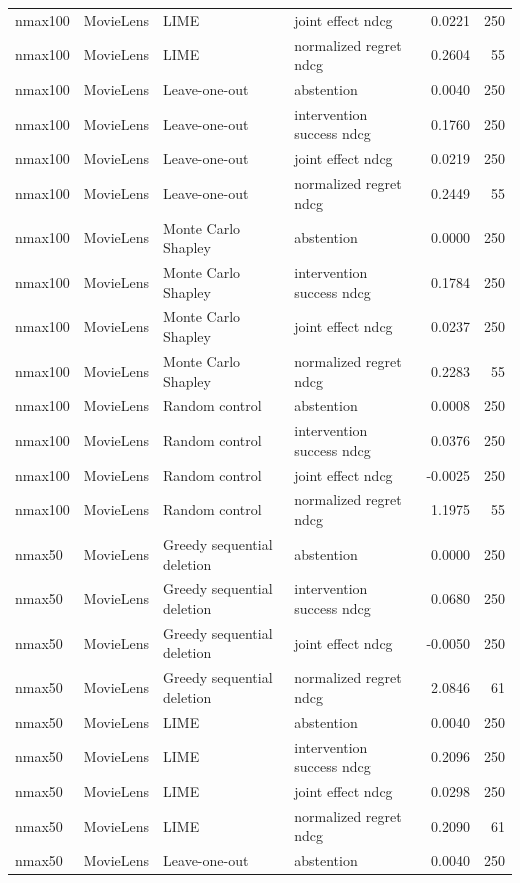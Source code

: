 \begin{longtable}{@{}p{}p{}p{}p{}rr@{}}
nmax100 & MovieLens & LIME & joint effect ndcg & 0.0221 & 250 \\
nmax100 & MovieLens & LIME & normalized regret ndcg & 0.2604 & 55 \\
nmax100 & MovieLens & Leave-one-out & abstention & 0.0040 & 250 \\
nmax100 & MovieLens & Leave-one-out & intervention success ndcg & 0.1760 & 250 \\
nmax100 & MovieLens & Leave-one-out & joint effect ndcg & 0.0219 & 250 \\
nmax100 & MovieLens & Leave-one-out & normalized regret ndcg & 0.2449 & 55 \\
nmax100 & MovieLens & Monte Carlo Shapley & abstention & 0.0000 & 250 \\
nmax100 & MovieLens & Monte Carlo Shapley & intervention success ndcg & 0.1784 & 250 \\
nmax100 & MovieLens & Monte Carlo Shapley & joint effect ndcg & 0.0237 & 250 \\
nmax100 & MovieLens & Monte Carlo Shapley & normalized regret ndcg & 0.2283 & 55 \\
nmax100 & MovieLens & Random control & abstention & 0.0008 & 250 \\
nmax100 & MovieLens & Random control & intervention success ndcg & 0.0376 & 250 \\
nmax100 & MovieLens & Random control & joint effect ndcg & -0.0025 & 250 \\
nmax100 & MovieLens & Random control & normalized regret ndcg & 1.1975 & 55 \\
nmax50 & MovieLens & Greedy sequential deletion & abstention & 0.0000 & 250 \\
nmax50 & MovieLens & Greedy sequential deletion & intervention success ndcg & 0.0680 & 250 \\
nmax50 & MovieLens & Greedy sequential deletion & joint effect ndcg & -0.0050 & 250 \\
nmax50 & MovieLens & Greedy sequential deletion & normalized regret ndcg & 2.0846 & 61 \\
nmax50 & MovieLens & LIME & abstention & 0.0040 & 250 \\
nmax50 & MovieLens & LIME & intervention success ndcg & 0.2096 & 250 \\
nmax50 & MovieLens & LIME & joint effect ndcg & 0.0298 & 250 \\
nmax50 & MovieLens & LIME & normalized regret ndcg & 0.2090 & 61 \\
nmax50 & MovieLens & Leave-one-out & abstention & 0.0040 & 250 \\

\end{longtable}
